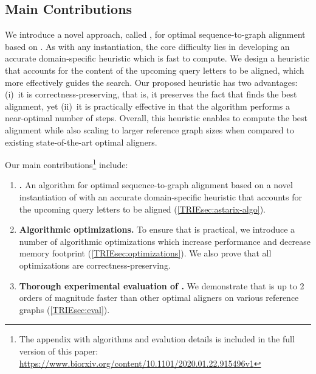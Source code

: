 \subsection{Main Contributions}
We introduce a novel approach, called \astarix, for optimal sequence-to-graph alignment based on \A. As with any \A instantiation, the core difficulty lies in developing an accurate domain-specific heuristic which is fast to compute.
We design a heuristic that accounts for the content of the upcoming query letters to be aligned, which more effectively guides the search.
Our proposed heuristic has two advantages: (i)~it is correctness-preserving, that is, it preserves the fact that \astarix finds the best alignment, yet (ii)~it is practically effective in that the algorithm performs a near-optimal number of steps. Overall, this heuristic enables \astarix to compute the best alignment while also scaling to larger reference graph sizes when compared to existing state-of-the-art optimal aligners.

\begin{samepage}
Our main contributions\footnote{The appendix with algorithms and evalution
details is included in the full version of this paper:
\url{https://www.biorxiv.org/content/10.1101/2020.01.22.915496v1}} include:
	
\begin{enumerate}
	\item \textbf{\astarix.} An algorithm for optimal sequence-to-graph
	alignment based on a novel instantiation of \A with an accurate
	domain-specific heuristic that accounts for the upcoming query letters to be
	aligned (\cref{TRIEsec:astarix-algo}).
	\item \textbf{Algorithmic optimizations.}
	To ensure that \astarix is practical, we introduce a number of algorithmic
	optimizations which increase performance and decrease memory footprint
	(\cref{TRIEsec:optimizations}). We also prove that all optimizations are
	correctness-preserving.
	\item \textbf{Thorough experimental evaluation of \astarix.}
	We demonstrate that \astarix is up to 2 orders of magnitude faster than
	other optimal aligners on various reference graphs (\cref{TRIEsec:eval}).
\end{enumerate}
\end{samepage}
